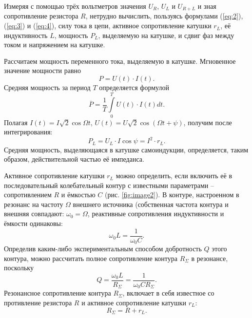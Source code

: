 \documentclass[a4paper,12pt]{article} %
\begin{document}
Измеряя с помощью трёх вольтметров значения $ U_R $, $ U_L $ и $ U_{R+L} $ и зная сопротивление резистора $ R $, нетрудно вычислить, пользуясь формулами (\ref{eq:2}), (\ref{eq:3}) и (\ref{eq:4}), силу тока в цепи, активное сопротивление катушки $ r_L $, её индуктивность $ L $, мощность $ P_L $, выделяемую на катушке, и сдвиг фаз между током и напряжением на катушке.

Рассчитаем мощность переменного тока, выделяемую в катушке. Мгновенное значение мощности равно
\begin{equation*}
P = U\left( t \right) \cdot I\left( t \right).
\end{equation*}
Средняя мощность за период $ T $ определяется формулой
\begin{equation*}
\overline P  = \frac{1}{T}\int\limits_0^T {U\left( t \right) \cdot I\left( t \right)dt}.
\end{equation*}
Полагая $ \displaystyle I\left( t \right) = I\sqrt 2 \cos \Omega t $, $ U\left( t \right) = U\sqrt 2 \cos \left( {\Omega t + \psi } \right) $, получим после интегрирования:
\begin{equation}\label{eq:5}
{P_L} = {U_L} \cdot I\cos \psi  = {I^2} \cdot {r_L}.
\end{equation}
Средняя мощность, выделяющаяся в катушке самоиндукции, определяется, таким образом, действительной частью её импеданса.

Активное сопротивление катушки $ r_L $ можно определить, если включить её в последовательный колебательный контур с известными параметрами -- сопротивлением $ R $ и ёмкостью $ C $ (рис. \ref{fig:image2}). В контуре, настроенном в резонанс на частоту $ \Omega $ внешнего источника (собственная частота контура и внешняя совпадают: $ \omega_0 = \Omega $, реактивные сопротивления индуктивности и ёмкости одинаковы:
\begin{equation}\label{eq:6}
{\omega _0}L = \frac{1}{{{\omega _0}C}}.
\end{equation}
Определив каким-либо экспериментальным способом добротность $ Q $ этого контура, можно рассчитать полное сопротивление контура $ R_{\Sigma} $ в резонансе, поскольку
\begin{equation}\label{eq:7}
Q = \frac{{{\omega _0}L}}{{{R_\Sigma }}} = \frac{1}{{{\omega _0}C{R_\Sigma }}}.
\end{equation}
Резонансное сопротивление контура $ R_{\Sigma} $, включает в себя известное со противление резистора $ R $ и активное сопротивление катушки $ r_L $:
\begin{equation}\label{eq:8}
{R_\Sigma } = R + {r_L}.
\end{equation}
\end{document}
